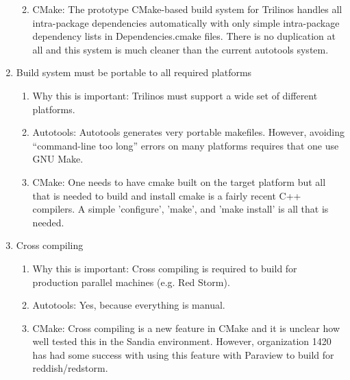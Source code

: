 \documentclass[pdf,ps2pdf,11pt]{SANDreport}
\begin{document}
\begin{enumerate}
\begin{enumerate}
  {}\item CMake: The prototype CMake-based build system for Trilinos
  handles all intra-package dependencies automatically with only simple
  intra-package dependency lists in Dependencies.cmake files.  There
  is no duplication at all and this system is much cleaner than the
  current autotools system.

  \end{enumerate}

{}\item Build system must be portable to all required platforms

  \begin{enumerate}

  {}\item Why this is important: Trilinos must support a wide set of
  different platforms.

  {}\item Autotools: Autotools generates very portable makefiles.
  However, avoiding ``command-line too long'' errors on many
  platforms requires that one use GNU Make.

  {}\item CMake: One needs to have cmake built on the target
  platform but all that is needed to build and install cmake is a
  fairly recent C++ compilers.  A simple 'configure', 'make', and
  'make install' is all that is needed. 

  \end{enumerate}

{}\item Cross compiling

  \begin{enumerate}

  {}\item Why this is important: Cross compiling is required to build
  for production parallel machines (e.g. Red Storm).

  {}\item Autotools: Yes, because everything is manual.

  {}\item CMake: Cross compiling is a new feature in CMake and it is
  unclear how well tested this in the Sandia environment.  However,
  organization 1420 has had some success with using this feature with
  Paraview to build for reddish/redstorm.

  \end{enumerate}

\end{enumerate}
\end{document}
